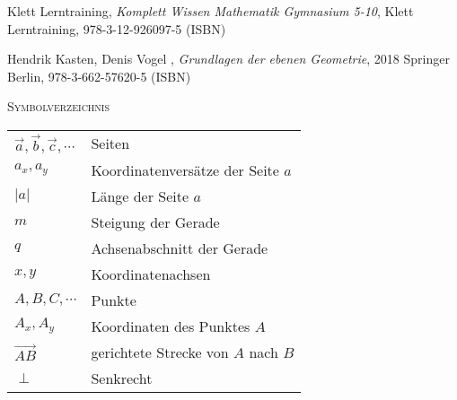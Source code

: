 \documentclass[a4paper]{amsart}
\theoremstyle{definition}
\begin{document}
\begin{thebibliography}{9}

      Klett Lerntraining, \emph{Komplett Wissen Mathematik Gymnasium 5-10},
      Klett Lerntraining, 978-3-12-926097-5 (ISBN)
      
       Hendrik Kasten, Denis Vogel , \emph{Grundlagen der ebenen Geometrie},
      2018 Springer Berlin, 978-3-662-57620-5 (ISBN)

\end{thebibliography}

\begin{large}
    \centerline{\textsc{Symbolverzeichnis}}
\end{large}
\bigskip

\renewcommand*{\arraystretch}{1}

\begin{tabular}{ll}
    $\vec a,\vec b, \vec c, \cdots$               &Seiten\\
    $a_x,a_y$                   &Koordinatenversätze der Seite $a$\\
    $|a|$                       &Länge der Seite $a$\\
    $m$                         &Steigung der Gerade\\
    $q$                         &Achsenabschnitt der Gerade\\
    $x, y$                      &Koordinatenachsen\\
    $A, B, C, \cdots$          &Punkte\\
    $A_x, A_y$                 &Koordinaten des Punktes $A$\\
    $\overrightarrow{AB}$      &gerichtete Strecke von $A$ nach $B$\\
    $\perp$                    &Senkrecht
\end{tabular}
\end{document}
